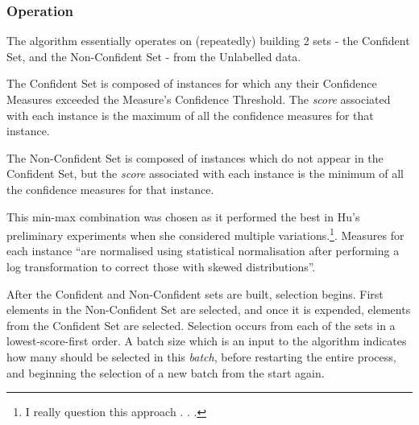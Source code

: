 \documentclass[a4paper,11pt]{report}
\begin{document}
\subsubsection{Operation}
The algorithm essentially operates on (repeatedly) building 2 sets - the Confident Set, and the Non-Confident Set - from the Unlabelled data.

The Confident Set is composed of instances for which any their Confidence Measures exceeded the Measure's Confidence Threshold. The \emph{score} associated with each instance is the maximum of all the confidence measures for that instance.

The Non-Confident Set is composed of instances which do not appear in the Confident Set, but the \emph{score} associated with each instance is the minimum of all the confidence measures for that instance. 

This min-max combination was chosen as it performed the best in Hu's preliminary experiments when she considered multiple variations.\footnote{I really question this approach . . .}. Measures for each instance ``are normalised using statistical normalisation after performing a log transformation to correct those with skewed distributions''\cite{Hu2011}.

After the Confident and Non-Confident sets are built, selection begins. First elements in the Non-Confident Set are selected, and once it is expended, elements from the Confident Set are selected. Selection occurs from each of the sets in a lowest-score-first order. A batch size which is an input to the algorithm indicates how many should be selected in this \emph{batch}, before restarting the entire process, and beginning the selection of a new batch from the start again.
\end{document}
